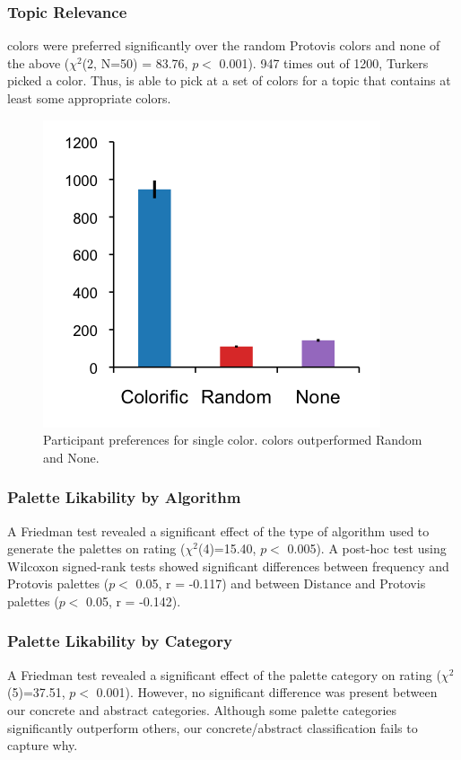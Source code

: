 \subsubsection{Topic Relevance} 
\system colors were preferred significantly over the random Protovis colors and none of the above ($\chi^2$(2, N=50) = 83.76, $p <$ 0.001). 947 times out of 1200, Turkers picked a \system color.  Thus, \system is able to pick at a set of colors for a topic that contains at least some appropriate colors.
\begin{figure}
\centering
\label{relevance}
\includegraphics[scale=0.75]{relevance_chart.png}
\caption{Participant preferences for single color. \system colors outperformed Random and None.}
\end{figure}
\subsubsection{Palette Likability by Algorithm} 
A Friedman test revealed a significant effect of the type of algorithm used to generate the palettes on rating ($\chi^2$(4)=15.40, $p <$ 0.005). A post-hoc test using Wilcoxon signed-rank tests showed significant differences between frequency and Protovis palettes ($p <$ 0.05, r = -0.117) and between Distance and Protovis palettes ($p <$ 0.05, r = -0.142).

\subsubsection{Palette Likability by Category}
A Friedman test revealed a significant effect of the palette category on rating ($\chi^2$(5)=37.51, $p <$ 0.001). However, no significant difference was present between our concrete and abstract categories. Although some palette categories significantly outperform others, our concrete/abstract classification fails to capture why.

